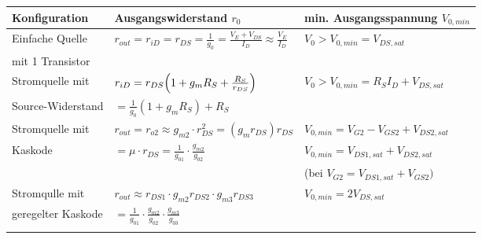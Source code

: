 \renewcommand{\arraystretch}{1.2}
\begin{tabular}{|l|l|l|}
    \hline
    \textbf{Konfiguration}  & \textbf{Ausgangswiderstand $r_0$}     & \textbf{min. Ausgangsspannung $V_{0,min}$} \\
    \hline
    Einfache Quelle      & $r_{out} = r_{iD} = r_{DS} = \frac{1}{g_0}= \frac{V_E+V_{DS}}{I_D}\approx\frac{V_E}{I_D}$ & $V_0 > V_{0,min} = V_{DS,sat}$ \\
    mit 1 Transistor     &  & \\
    \hline
    Stromquelle mit      & $r_{iD} = r_{DS}\Bigl(1+g_m R_S+\frac{R_S}{r_{DS}}\Bigr)$ & $V_0 > V_{0,min} = R_S I_D + V_{DS,sat}$ \\
    Source-Widerstand    & $= \frac{1}{g_0}(1+g_m R_S)+R_S$ & \\
    \hline
    Stromquelle mit      & $r_{out} = r_{o2}\approx g_{m2}\cdot r_{DS}^2 = (g_m r_{DS})r_{DS}$ & $V_{0,min} = V_{G2}-V_{GS2}+V_{DS2,sat}$\\
    Kaskode              & $= \mu\cdot r_{DS} = \frac{1}{g_{01}}\cdot\frac{g_{m2}}{g_{02}}$ & $V_{0,min} = V_{DS1,sat}+V_{DS2,sat}$ \\
        &   & (bei $V_{G2} = V_{DS1,sat} +V_{GS2})$ \\
    \hline
    Stromqulle mit       & $r_{out}\approx r_{DS1}\cdot g_{m2}r_{DS2}\cdot g_{m3}r_{DS3}$ & $V_{0,min} = 2 V_{DS,sat}$\\
    geregelter Kaskode   & $=\frac{1}{g_{01}}\cdot\frac{g_{m2}}{g_{02}}\cdot\frac{g_{m3}}{g_{03}}$ &  \\
        & & \\
    \hline
\end{tabular}\newpage
